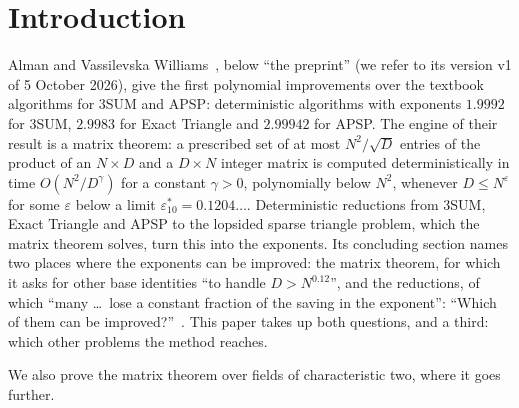\documentclass[11pt]{article}
\theoremstyle{definition}
\theoremstyle{remark}
\newcommand{\et}{\varepsilon^*_{10}}
\begin{document}
\section{Introduction}\label{m:sec:intro}

Alman and Vassilevska Williams~\cite{ZT}, below ``the preprint'' (we refer to its version v1 of 5 October 2026), give the first polynomial improvements over the textbook algorithms for 3SUM and APSP: deterministic algorithms with exponents $1.9992$ for 3SUM, $2.9983$ for Exact Triangle and $2.99942$ for APSP. The engine of their result is a matrix theorem: a prescribed set of at most $N^2/\sqrt D$ entries of the product of an $N\times D$ and a $D\times N$ integer matrix is computed deterministically in time $O(N^2/D^\gamma)$ for a constant $\gamma>0$, polynomially below $N^2$, whenever $D\le N^\varepsilon$ for some $\varepsilon$ below a limit $\et=0.1204\ldots$. Deterministic reductions from 3SUM, Exact Triangle and APSP to the lopsided sparse triangle problem, which the matrix theorem solves, turn this into the exponents. Its concluding section names two places where the exponents can be improved: the matrix theorem, for which it asks for other base identities ``to handle $D>N^{0.12}$'', and the reductions, of which ``many \ldots\ lose a constant fraction of the saving in the exponent'': ``Which of them can be improved?''~\cite[Section~6]{ZT}. This paper takes up both questions, and a third: which other problems the method reaches.

We also prove the matrix theorem over fields of characteristic two, where it goes further.%
\end{document}
